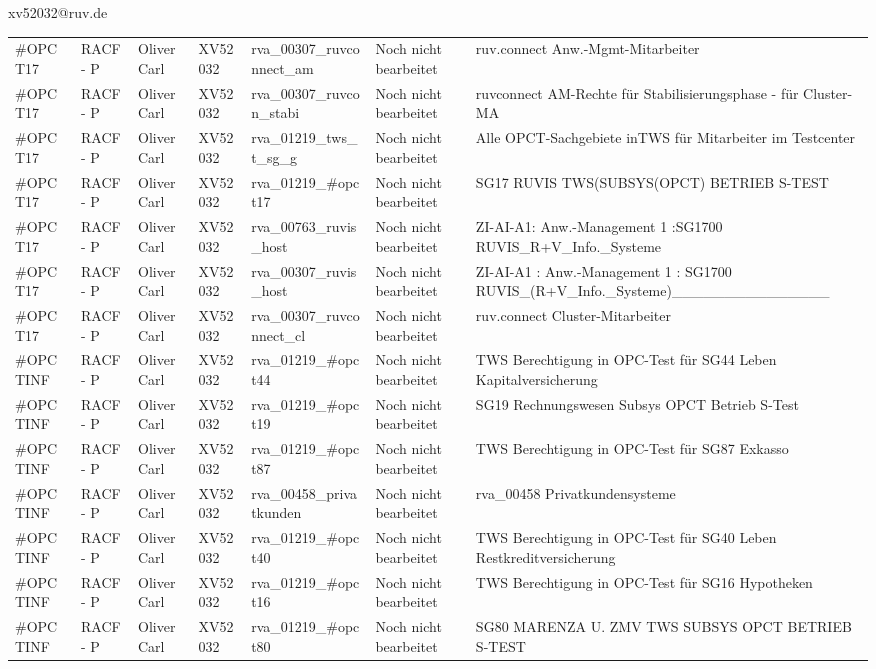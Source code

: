 \documentclass[a4paper,landscape,12pt]{letter}
\begin{document}
\begin{letter}{xv52032@ruv.de\hfill \break}
\begin{tiny}
\begin{longtable}{|p{35mm}|p{15mm}|p{25mm}|p{10mm}|p{40mm}|p{50mm}|p{50mm}|}
\#OPCT17 & RACF - P & Oliver Carl & XV52032 & rva\_00307\_ruvconnect\_am & Noch nicht bearbeitet & ruv.connect Anw.-Mgmt-Mitarbeiter \\
\#OPCT17 & RACF - P & Oliver Carl & XV52032 & rva\_00307\_ruvcon\_stabi & Noch nicht bearbeitet & ruvconnect AM-Rechte für Stabilisierungsphase - für Cluster-MA \\
\#OPCT17 & RACF - P & Oliver Carl & XV52032 & rva\_01219\_tws\_t\_sg\_g & Noch nicht bearbeitet & Alle OPCT-Sachgebiete inTWS für Mitarbeiter im Testcenter \\
\#OPCT17 & RACF - P & Oliver Carl & XV52032 & rva\_01219\_\#opct17 & Noch nicht bearbeitet & SG17 RUVIS TWS(SUBSYS(OPCT) BETRIEB S-TEST \\
\#OPCT17 & RACF - P & Oliver Carl & XV52032 & rva\_00763\_ruvis\_host & Noch nicht bearbeitet & ZI-AI-A1: Anw.-Management 1 :SG1700 RUVIS\_R+V\_Info.\_Systeme \\
\#OPCT17 & RACF - P & Oliver Carl & XV52032 & rva\_00307\_ruvis\_host & Noch nicht bearbeitet & ZI-AI-A1   : Anw.-Management 1 : SG1700 RUVIS\_(R+V\_Info.\_Systeme)\_\_\_\_\_\_\_\_\_\_\_\_\_\_\_ \\
\#OPCT17 & RACF - P & Oliver Carl & XV52032 & rva\_00307\_ruvconnect\_cl & Noch nicht bearbeitet & ruv.connect Cluster-Mitarbeiter \\
\#OPCTINF & RACF - P & Oliver Carl & XV52032 & rva\_01219\_\#opct44 & Noch nicht bearbeitet & TWS Berechtigung in OPC-Test für SG44 Leben Kapitalversicherung \\
\#OPCTINF & RACF - P & Oliver Carl & XV52032 & rva\_01219\_\#opct19 & Noch nicht bearbeitet & SG19 Rechnungswesen Subsys OPCT Betrieb S-Test \\
\#OPCTINF & RACF - P & Oliver Carl & XV52032 & rva\_01219\_\#opct87 & Noch nicht bearbeitet & TWS Berechtigung in OPC-Test für SG87 Exkasso \\
\#OPCTINF & RACF - P & Oliver Carl & XV52032 & rva\_00458\_privatkunden & Noch nicht bearbeitet & rva\_00458 Privatkundensysteme \\
\#OPCTINF & RACF - P & Oliver Carl & XV52032 & rva\_01219\_\#opct40 & Noch nicht bearbeitet & TWS Berechtigung in OPC-Test für SG40 Leben Restkreditversicherung \\
\#OPCTINF & RACF - P & Oliver Carl & XV52032 & rva\_01219\_\#opct16 & Noch nicht bearbeitet & TWS Berechtigung in OPC-Test für SG16 Hypotheken \\
\#OPCTINF & RACF - P & Oliver Carl & XV52032 & rva\_01219\_\#opct80 & Noch nicht bearbeitet & SG80 MARENZA U. ZMV TWS SUBSYS OPCT BETRIEB S-TEST \\

\end{longtable}
\end{tiny}
\end{letter}
\end{document}
